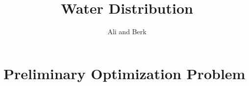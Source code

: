 \documentclass[12pt]{article}
\begin{document}
 
 
 
\title{Water Distribution}%
\author{Ali and Berk\\ %
} %
 
\maketitle
 
\section{Preliminary Optimization Problem}
\end{document}
